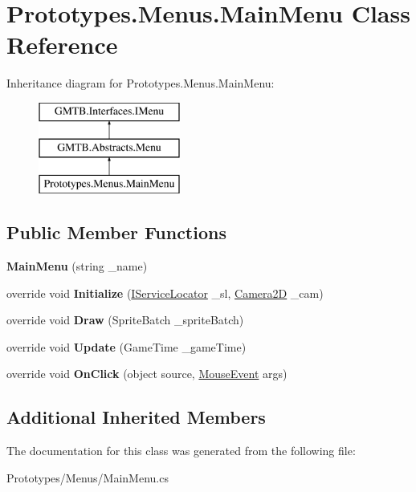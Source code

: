 \hypertarget{class_prototypes_1_1_menus_1_1_main_menu}{}\section{Prototypes.\+Menus.\+Main\+Menu Class Reference}
\label{class_prototypes_1_1_menus_1_1_main_menu}
Inheritance diagram for Prototypes.\+Menus.\+Main\+Menu\+:\begin{figure}[H]
\begin{center}
\leavevmode
\includegraphics[height=3.000000cm]{class_prototypes_1_1_menus_1_1_main_menu}
\end{center}
\end{figure}
\subsection*{Public Member Functions}
\begin{DoxyCompactItemize}
\item 
\mbox{\label{class_prototypes_1_1_menus_1_1_main_menu_ae5e7e1c3be1421e9de68345495d595a3}} 
{\bfseries Main\+Menu} (string \+\_\+name)
\item 
\mbox{\label{class_prototypes_1_1_menus_1_1_main_menu_ac43ab33fd90823a0aea32e7d23a1f94e}} 
override void {\bfseries Initialize} (\mbox{\hyperlink{interface_g_m_t_b_1_1_interfaces_1_1_i_service_locator}{I\+Service\+Locator}} \+\_\+sl, \mbox{\hyperlink{class_g_m_t_b_1_1_camera2_d}{Camera2D}} \+\_\+cam)
\item 
\mbox{\label{class_prototypes_1_1_menus_1_1_main_menu_ab321f508bbeb1533576931308c1bdc8b}} 
override void {\bfseries Draw} (Sprite\+Batch \+\_\+sprite\+Batch)
\item 
\mbox{\label{class_prototypes_1_1_menus_1_1_main_menu_afe160fbfd426fdaf2f33366a766e5b6f}} 
override void {\bfseries Update} (Game\+Time \+\_\+game\+Time)
\item 
\mbox{\label{class_prototypes_1_1_menus_1_1_main_menu_abe20436674d350d41545bcd07ac0e802}} 
override void {\bfseries On\+Click} (object source, \mbox{\hyperlink{class_g_m_t_b_1_1_input_system_1_1_mouse_event}{Mouse\+Event}} args)
\end{DoxyCompactItemize}
\subsection*{Additional Inherited Members}


The documentation for this class was generated from the following file\+:\begin{DoxyCompactItemize}
\item 
Prototypes/\+Menus/Main\+Menu.\+cs\end{DoxyCompactItemize}
